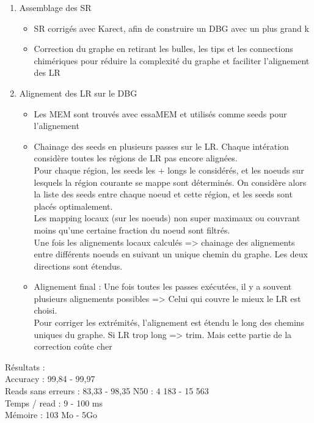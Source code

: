 \documentclass[12pt]{article}
\begin{document}
\begin{enumerate}
	\item Assemblage des SR
	\begin{itemize}
		\item SR corrigés avec Karect, afin de construire un DBG avec un plus grand k
		\item Correction du graphe en retirant les bulles, les tips et les connections chimériques pour réduire la complexité du graphe
			  et faciliter l'alignement des LR
	\end{itemize}
	\item Alignement des LR sur le DBG
	\begin{itemize}
		\item Les MEM sont trouvés avec essaMEM et utilisés comme seeds pour l'alignement
		\item Chainage des seeds en plusieurs passes sur le LR. Chaque intération considère toutes les régions de LR pas encore alignées. \\
			  Pour chaque région, les seeds les + longs le considérés, et les noeuds sur lesquels la région courante se mappe sont déterminés.
			  On considère alors la liste des seeds entre chaque noeud et cette région, et les seeds sont placés optimalement. \\
			  Les mapping locaux (sur les noeuds) non super maximaux ou couvrant moins qu'une certaine fraction du noeud sont filtrés. \\
			  Une fois les alignements locaux calculés => chainage des alignements entre différents noeuds en suivant un unique chemin du graphe.
			  Les deux directions sont étendus.
		\item Alignement final : Une fois toutes les passes exécutées, il y a souvent plusieurs alignements possibles => Celui qui
			  couvre le mieux le LR est choisi. \\
			  Pour corriger les extrémités, l'alignement est étendu le long des chemins uniques du graphe. Si LR trop long => trim. Mais cette
			  partie de la correction coûte cher
	\end{itemize}
\end{enumerate}

Résultats : \\

Accuracy : 99,84 - 99,97 \\
Reads sans erreurs : 83,33 - 98,35
N50 : 4 183 - 15 563 \\
Temps / read : 9 - 100 ms \\
Mémoire : 103 Mo - 5Go \\
\end{document}
